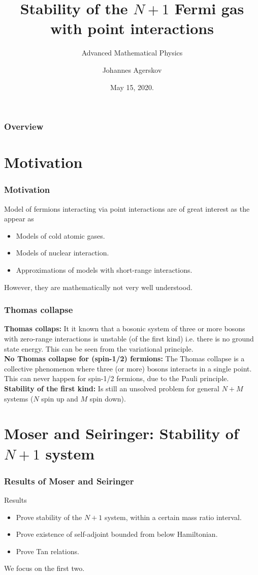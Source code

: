 \documentclass{beamer}[10]
\title{Stability of the $ N+1 $ Fermi gas with point interactions}
\subtitle{Advanced Mathematical Physics}
\author{Johannes Agerskov}
\institute{Institute for Mathematical Sciences \\ University of Copenhagen}
\date{May 15, 2020.}
\begin{document}
\frame{\titlepage \vspace{-0.5cm}
}

\frame
{
\frametitle{Overview}
\linespread{1.5}
\tableofcontents%
}
\section{Motivation}
\begin{frame}
	\frametitle{Motivation}
	Model of fermions interacting via point interactions are of great interest as the appear as
	\begin{itemize}
		\item Models of cold atomic gases.\\
		\item Models of nuclear interaction.\\
		\item Approximations of models with short-range interactions.
	\end{itemize}
	However, they are mathematically not very well understood.
\end{frame}

\begin{frame}
	\frametitle{Thomas collapse}
	\textbf{Thomas collaps:}
	It it known that a bosonic system of three or more bosons with zero-range interactions is unstable (of the first kind) i.e. there is no ground state energy. This can be seen from the variational principle.\\\vspace*{0.5cm}
	\textbf{No Thomas collapse for (spin-1/2) fermions:} The Thomas collapse is a collective phenomenon where three (or more) bosons interacts in a single point. This can never happen for spin-1/2 fermions, due to the Pauli principle.\\\vspace*{0.5cm}
	\textbf{Stability of the first kind:} Is still an unsolved problem for general $ N+M $ systems ($ N $ spin up and $ M $ spin down).
\end{frame}
\section{Moser and Seiringer: Stability of $ N+1 $ system}
\begin{frame}
	\frametitle{Results of Moser and Seiringer}
	\begin{block}{Results}
		\begin{itemize}
			\item Prove stability of the $ N+1 $ system, within a certain mass ratio interval.
			\item Prove existence of self-adjoint bounded from below Hamiltonian.
			\item Prove Tan relations.
		\end{itemize}
	\end{block}
	We focus on the first two.
\end{frame}
\end{document}
